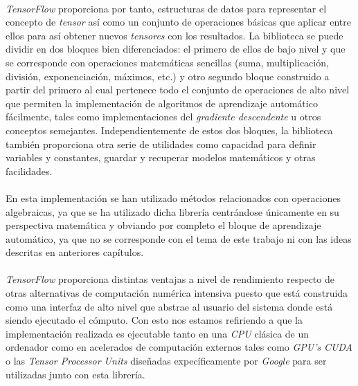 \documentclass{subfiles}
\begin{document}
          \paragraph{}
          \emph{TensorFlow} proporciona por tanto, estructuras de datos para representar el concepto de \emph{tensor} así como un conjunto de operaciones básicas que aplicar entre ellos para así obtener nuevos \emph{tensores} con los resultados. La biblioteca se puede dividir en dos bloques bien diferenciados: el primero de ellos de bajo nivel y que se corresponde con operaciones matemáticas sencillas (suma, multiplicación, división, exponenciación, máximos, etc.) y otro segundo bloque construido a partir del primero al cual pertenece todo el conjunto de operaciones de alto nivel que permiten la implementación de algoritmos de aprendizaje automático fácilmente, tales como implementaciones del \emph{gradiente descendente} u otros conceptos semejantes. Independientemente de estos dos bloques, la biblioteca también proporciona otra serie de utilidades como capacidad para definir variables y constantes, guardar y recuperar modelos matemáticos y otras facilidades.

          \paragraph{}
          En esta implementación se han utilizado métodos relacionados con operaciones algebraicas, ya que se ha utilizado dicha librería centrándose únicamente en su perspectiva matemática y obviando por completo el bloque de aprendizaje automático, ya que no se corresponde con el tema de este trabajo ni con las ideas descritas en anteriores capítulos.

          \paragraph{}
          \emph{TensorFlow} proporciona distintas ventajas a nivel de rendimiento respecto de otras alternativas de computación numérica intensiva puesto que está construida como una interfaz de alto nivel que abstrae al usuario del sistema donde está siendo ejecutado el cómputo. Con esto nos estamos refiriendo a que la implementación realizada es ejecutable tanto en una \emph{CPU} clásica de un ordenador como en acelerados de computación externos tales como \emph{GPU's} \emph{CUDA} o las \emph{Tensor Processor Units} \cite{jouppi2017datacenter} diseñadas expecíficamente por \emph{Google} para ser utilizadas junto con esta librería.
\end{document}
